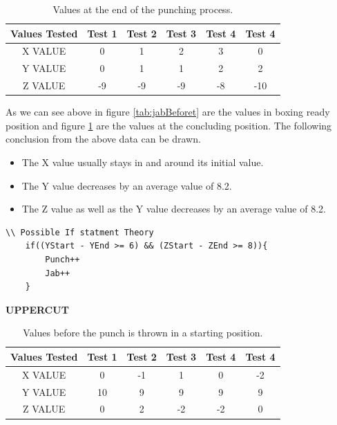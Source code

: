 \documentclass[a4paper,12pt]{report}
\begin{document}
\begin{table}[h]
    \centering
    \begin{tabular}{||c c c c c c||} 
     \hline
     \textbf{Values Tested} & \textbf{Test 1} & \textbf{Test 2} & \textbf{Test 3} & \textbf{Test 4} & \textbf{Test 4} \\ [0.5ex] 
     \hline\hline
     X VALUE & 0 & 1 & 2 & 3 & 0\\ 
     \hline
     Y VALUE & 0 & 1 & 1 & 2 & 2\\  
     \hline
     Z VALUE & -9 & -9 & -9 & -8 & -10\\
     \hline
    \end{tabular}
    \caption{Values at the end of the punching process.}
    \label{tab:jabAfter}
\end{table}

As we can see above in figure \ref{tab:jabBeforet} are the values in boxing ready position and  figure \ref{tab:jabAfter} are the values at the concluding position.
The following conclusion from the above data can be drawn. 
\begin{itemize}
    \item The X value usually stays in and around its initial value.
    \item The Y value decreases by an average value of 8.2.
    \item The Z value as well as the Y value decreases by an average value of 8.2.
\end{itemize}
\begin{verbatim}
\\ Possible If statment Theory
    if((YStart - YEnd >= 6) && (ZStart - ZEnd >= 8)){
        Punch++
        Jab++
    }
\end{verbatim}


\begin{center}
    \textbf{UPPERCUT}
\end{center}{}
\begin{table}[h]
    \centering
    \begin{tabular}{||c c c c c c||} 
     \hline
     \textbf{Values Tested} & \textbf{Test 1} & \textbf{Test 2} & \textbf{Test 3} & \textbf{Test 4} & \textbf{Test 4} \\ [0.5ex] 
     \hline\hline
     X VALUE & 0 & -1 & 1 & 0 & -2\\ 
     \hline
     Y VALUE & 10 & 9 & 9 & 9 & 9\\  
     \hline
     Z VALUE & 0 & 2 & -2 & -2 & 0\\
     \hline
    \end{tabular}
    \caption{Values before the punch is thrown in a starting position.}
    \label{tab:uppercutBeforet}
\end{table}
\end{document}
